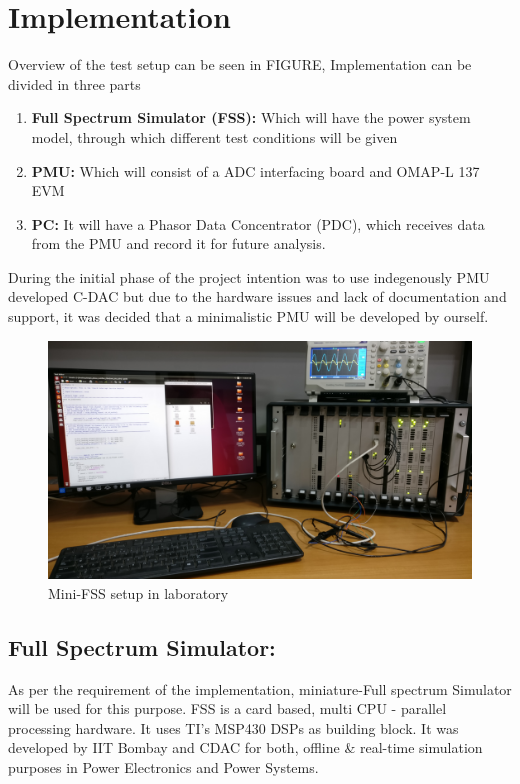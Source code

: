 \section{Implementation}
Overview of the test setup can be seen in FIGURE, Implementation can be divided in three parts
\begin{enumerate}
\item \textbf{Full Spectrum Simulator (FSS):} Which will have the power system model, through which different test conditions will be given
\item \textbf{PMU:} Which will consist of a ADC interfacing board and OMAP-L 137 EVM
\item \textbf{PC:} It will have a Phasor Data Concentrator (PDC), which receives data from the PMU and record it for future analysis.
\end{enumerate}
During the initial phase of the project intention was to use indegenously PMU developed C-DAC but due to the hardware issues and lack of documentation and support, it was decided that a minimalistic PMU will be developed by ourself.

\begin{figure}[t]
\includegraphics[width=\columnwidth]{fig/FSS_setup.jpg}
\caption{Mini-FSS setup in laboratory}
\label{fig:fss_setup}
\end{figure}

\subsection{Full Spectrum Simulator:}
As per the requirement of the implementation, miniature-Full spectrum Simulator will be used for this purpose. FSS is a card based, multi CPU - parallel processing hardware. It uses TI's MSP430 DSPs as building block. It was developed by IIT Bombay and CDAC for both, offline \& real-time  simulation purposes in Power Electronics and Power Systems.

